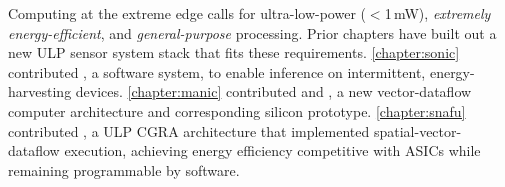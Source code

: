 


Computing at the extreme edge
calls for ultra-low-power ($<$1\,mW),
\emph{extremely energy-efficient},
and \emph{general-purpose} processing.
% 
Prior chapters have built out a new ULP sensor system stack that fits these requirements.
% 
\autoref{chapter:sonic} contributed \sonic, a software system, to enable inference on intermittent, energy-harvesting devices.
%
\autoref{chapter:manic} contributed \manic and \msilicon, a new vector-dataflow computer architecture and corresponding silicon prototype.
%
\autoref{chapter:snafu} contributed \snafu, a ULP CGRA architecture that implemented spatial-vector-dataflow execution, achieving energy efficiency competitive with ASICs while remaining programmable by software.
% 

